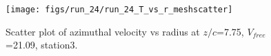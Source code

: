 \begin{figure}[H]
\centering
\texttt{[image: figs/run\_24/run\_24\_T\_vs\_r\_meshscatter]}
\caption{Scatter plot of azimuthal velocity vs radius at $z/c$=7.75, $V_{free}$=21.09, station3.}
\label{fig:run_24_T_vs_r_meshscatter}
\end{figure}


